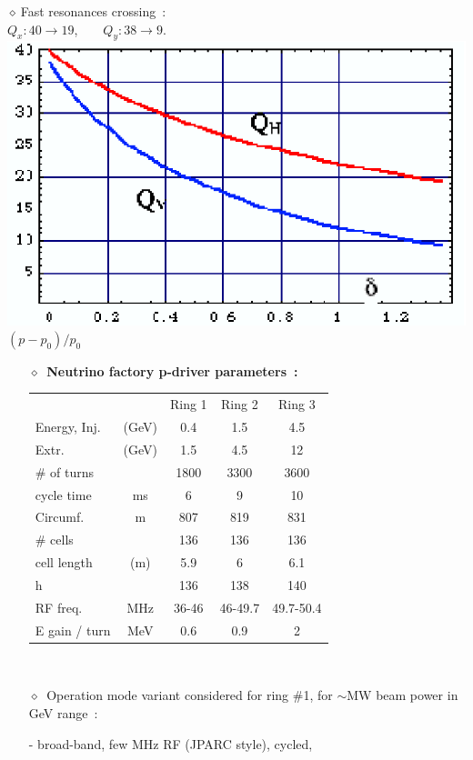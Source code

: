 \documentclass[12pt]{article}
\newcommand{\nid}{\noindent \ensuremath{\diamond~}}
\newcommand{\blue}{\color{blue}}
\begin{document}
{\begin{minipage}{0.44\linewidth}
\begin{center}
\blue
  \nid Fast resonances crossing~:  \\
$Q_x : 40 \rightarrow 19$, ~ ~ $Q_y : 38 \rightarrow 9$.  \\
    \includegraphics[width=0.5\linewidth]{./figs_FFAG_introSlides/ruggiero_tunes.eps} \\[-1.5ex]
               $(p-p_0)/p_0$
  \end{center}
\end{minipage}%
\begin{minipage}{0.59\linewidth}
\begin{itemize}
\item[\nid] {\bf Neutrino factory p-driver parameters~:
}

\begin{tabular}{lcccc}
\hline 
            &&  \blue  Ring 1     &  Ring 2 & Ring 3       \\
Energy, Inj. &(GeV) &\blue   0.4  &  1.5  &  4.5   \\
\hfill Extr. &(GeV) & \blue  1.5  &  4.5  &  12   \\
\# of turns   && \blue 1800 & 3300 & 3600 \\
cycle time &ms&  \blue 6 & 9 & 10  \\ 
Circumf. &m& \blue 807  &  819  &  831 \\ 
\# cells &&  \blue  136  &  136 & 136  \\
cell length  & (m)  &  \blue 5.9  &  6  &  6.1  \\
h  &&  \blue 136  &  138  &  140  \\
RF freq. &MHz& \blue 36-46 & 46-49.7 & 49.7-50.4   \\ 
E gain / turn & MeV & \blue  0.6 & 0.9 & 2 \\
\hline 
\end{tabular}

~

\blue

\item[\nid] Operation mode variant considered for ring \#1, 
 for $\sim$MW beam power in GeV range~: 

- broad-band, few MHz RF (JPARC style), cycled, 


\end{itemize}
\end{minipage}}
\end{document}
